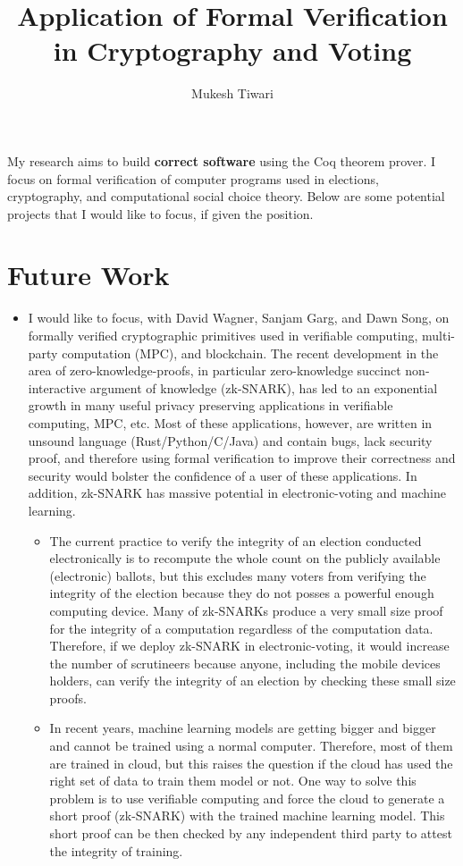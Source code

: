 \documentclass[a4paper]{article}
\title{Application of Formal Verification in Cryptography and Voting}
\author{Mukesh Tiwari}
\date{}
\begin{document}
\fontsize{11}{15}
\selectfont
\maketitle

My research aims to build \textbf{correct software} 
using the Coq theorem prover. 
I focus on formal verification of computer programs used in elections, cryptography, 
and computational social choice theory. Below are some potential projects 
that I would like to focus, if given the position.


\section{Future Work}
\begin{itemize}
    \item I would like to focus, with David Wagner, Sanjam Garg, and Dawn Song,  
	on formally verified cryptographic primitives used in
	verifiable computing, multi-party computation (MPC), and blockchain. 
    The recent development in the area of zero-knowledge-proofs, in particular 
	zero-knowledge succinct non-interactive argument of knowledge (zk-SNARK), 
	has led to an exponential growth in many useful 
	privacy preserving applications in verifiable computing, MPC, etc. Most of these 
	applications, however, are written 
	in unsound language (Rust/Python/C/Java) and contain bugs,
	lack security proof, and therefore using formal verification 
	to improve their correctness and security would bolster the 
	confidence of a user of these applications.
	In addition, zk-SNARK has massive potential in electronic-voting and machine learning. 
	\begin{itemize}
		\item The current practice to verify the integrity of an election conducted electronically is to 
		recompute the whole count on the publicly available (electronic) ballots, but 
		this excludes many voters from verifying the integrity of the election because 
		they do not posses a powerful enough computing device. Many of 
		zk-SNARKs produce a very small size proof for the integrity of a computation 
		regardless of the computation data. Therefore, if we deploy zk-SNARK in 
		electronic-voting, it would increase the number of scrutineers because anyone, including the 
		mobile devices holders, can verify the integrity of an election by checking these small size proofs. 
		\item In recent years, 
   machine learning models are getting bigger and bigger and cannot be trained using a normal computer. 
   Therefore, most of them are trained in cloud, but this 
   raises the question if the cloud has used the right set of data to train them model or not. 
   One way to solve this problem is to use verifiable computing and force the cloud to generate 
   a short proof (zk-SNARK) with the trained machine learning model. 
   This short proof can be then checked by any independent third party to attest the 
   integrity of training. 
	\end{itemize}


\end{itemize}
\end{document}
